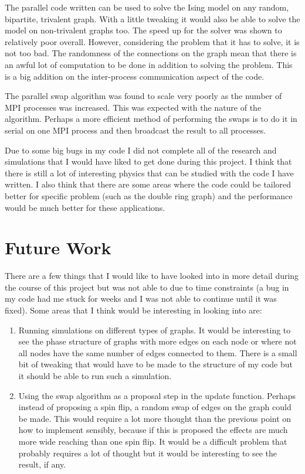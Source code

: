 \documentclass[pdftex,12pt,a4paper]{article}
\begin{document}
The parallel code written can be used to solve the Ising model on any random, bipartite, trivalent graph. With a little tweaking it would also be able to solve the model on non-trivalent graphs too. The speed up for the solver was shown to relatively poor overall. However, considering the problem that it has to solve, it is not too bad. The randomness of the connections on the graph mean that there is an awful lot of computation to be done in addition to solving the problem. This is a big addition on the inter-process communication aspect of the code.

The parallel swap algorithm was found to scale very poorly as the number of MPI processes was increased. This was expected with the nature of the algorithm. Perhaps a more efficient method of performing the swaps is to do it in serial on one MPI process and then broadcast the result to all processes.

Due to some big bugs in my code I did not complete all of the research and simulations that I would have liked to get done during this project. I think that there is still a lot of interesting physics that can be studied with the code I have written. I also think that there are some areas where the code could be tailored better for specific problem (such as the double ring graph) and the performance would be much better for these applications.


\newpage

\section{Future Work}

There are a few things that I would like to have looked into in more detail during the course of this project but was not able to due to time constraints (a bug in my code had me stuck for weeks and I was not able to continue until it was fixed). Some areas that I think would be interesting in looking into are:
\begin{enumerate}
\item Running simulations on different types of graphs. It would be interesting to see the phase structure of graphs with more edges on each node or where not all nodes have the same number of edges connected to them. There is a small bit of tweaking that would have to be made to the structure of my code but it should be able to run such a simulation.
\item Using the swap algorithm as a proposal step in the update function. Perhaps instead of proposing a spin flip, a random swap of edges on the graph could be made. This would require a lot more thought than the previous point on how to implement sensibly, because if this is proposed the effects are much more wide reaching than one spin flip. It would be a difficult problem that probably requires a lot of thought but it would be interesting to see the result, if any.
\end{enumerate}
\end{document}
